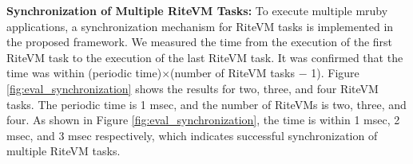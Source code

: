 \documentclass[conference]{IEEEtran/IEEEtran/IEEEtran}
\begin{document}

{\bf Synchronization of Multiple RiteVM Tasks:}
To execute multiple mruby applications, a synchronization mechanism for RiteVM tasks is implemented in the proposed framework.
We measured the time from the execution of the first RiteVM task to the execution of the last RiteVM task.
It was confirmed that the time was within (periodic time)$\times$(number of RiteVM tasks $-$ 1).
Figure \ref{fig:eval_synchronization} shows the results for two, three, and four RiteVM tasks.
The periodic time is 1 msec, and the number of RiteVMs is two, three, and four.
As shown in Figure \ref{fig:eval_synchronization}, the time is within 1 msec, 2 msec, and 3 msec respectively, which indicates successful synchronization of multiple RiteVM tasks.
\end{document}
